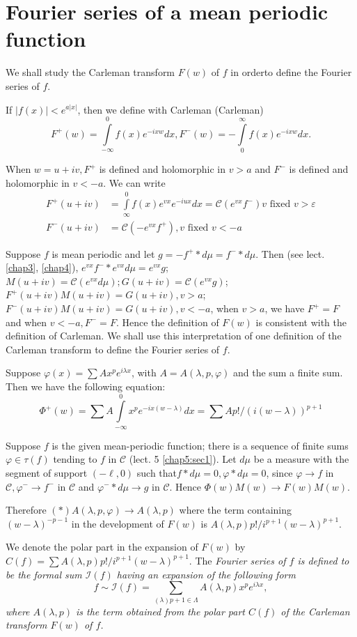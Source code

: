 \section{Fourier series of a mean periodic function}\label{chap6:sec2}%

We shall study the Carleman transform $F (w)$ of $f$ in order\pageoriginale to
define the Fourier series of $f$. 

If $\Big|f(x)\Big| < e^{a |x|}$, then we define with Carleman (Carleman)
$$
F^+ (w) = \int\limits^0_{-\infty}f(x) e^{-ixw} dx, F^- (w) =
-\int\limits_0^\infty f(x) e^{-ixw}dx. 
$$

When $w = u + iv, F^+$ is defined and holomorphic in $v>a$ and $F^-$
is defined and holomorphic in $v < -a$. We can write 
\begin{align*}
 F^+ (u + iv) &= \int\limits_\infty^0 f (x) e^{vx}e^{-iux}dx =
 \mathscr{C}(e^{vx}f^-)v \text{ fixed } v > \varepsilon \\ 
 F^- (u + iv) &= \mathscr{C} (-e^{vx}f^+ ), v \text{ fixed } v < -a
\end{align*}

Suppose $f$ is mean periodic and let $g = -f^+ * d \mu= f^- * d \mu$. Then (see
lect. \ref{chap3}, \ref{chap4}), $e^{vx} f^- * e^{vx}d \mu = e^{vx}g$;
$M(u + iv) = 
\mathscr{C}(e^{vx} d \mu); G(u + iv) = \mathscr{C}(e^{vx}g)$; $F^+ (u +
iv) M(u + iv) = G(u + iv), v>a$; $F^-(u+iv)M(u+iv)=G(u+iv), v<-a$, when
$v > a$, we have $F^+ = F$ and when $v < -a, F^-=F$. Hence the
definition of $F(w)$ is consistent with the definition of Carleman. We
shall use this interpretation of one definition of the Carleman
transform to define the Fourier series of $f$. 

Suppose $\varphi (x) =\sum A x^p e^{i \lambda x}$, with $A =
A(\lambda, p, \varphi)$ and the sum a finite sum. Then we have the
following equation: 
$$
\Phi^+(w)= \sum A \int\limits_{-\infty}^{0}x^p e^{-
 ix(w-\lambda)}dx=\sum Ap ! / (i(w- \lambda))^{p+1} 
$$

Suppose $f$ is the given mean-periodic function; there is a sequence
of finite sums $\varphi \in \tau(f)$ tending to $f$ in $\mathscr{C}$
(lect. 5 \ref{chap5:sec1}). Let $d \mu$ be a measure with the segment of support
$(-\ell, 0)$ such that\pageoriginale $f * d \mu=0, \varphi * d \mu =0$, since
$\varphi \to f$ in $\mathscr{C}, \varphi^- \to f^-$ in $\mathscr{C}$
and $\varphi^-* d \mu \to g $ in $\mathscr{C}$. Hence $\Phi(w) M(w)
\to F(w)M(w)$. 

Therefore $(*) A(\lambda, p, \varphi) \to A(\lambda, p)$ where the
term containing $(w-\lambda)^{-p-1}$ in the development of $F (w)$ is
$A (\lambda, p) p! / i^{p + 1}(w - \lambda)^{p + 1}$. 
\begin{defi*}
 We denote the polar part in the expansion of $F (w)$ by $C (f) =
 \sum A(\lambda, p)p! / i^{p+1}(w - \lambda)^{p+1}$. The \em{Fourier
 series} of $f$ is defined to be the formal sum $\mathscr{I}(f)$
 having an expansion of the following form 
 $$
 f \sim \mathscr{I}(f) = \sum_{(\lambda ) p + 1 \in \Lambda}
 A(\lambda, p) x^p e^{i \lambda x}, 
 $$
 where $A(\lambda, p)$ is the term obtained from the polar part
 $C(f)$ of the Carleman transform $F (w)$ of $f$. 
\end{defi*}

